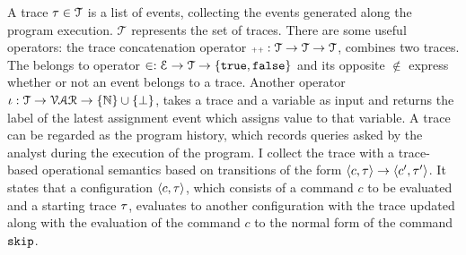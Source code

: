 A trace $\mathtt{\tau} \in \mathcal{T} $ is a list of events, 
collecting the events generated along the program execution. $\mathcal{T} $ represents the set of traces. There are some useful operators: the trace concatenation operator ${\scriptscriptstyle ++}: \mathcal{T} \to \mathcal{T} \to \mathcal{T}$, combines two traces.
The belongs to operator $\in : \mathcal{E} \to \mathcal{T} \to \{\mathtt{true}, \mathtt{false} \} $ and its opposite $\not\in$
express whether or not an event belongs to a trace.
Another operator $\iota : \mathcal{T} \to \mathcal{VAR} \to \{\mathbb{N}\}\cup \{\bot\}$,
takes a trace and a variable as input and returns the label of the latest assignment event which assigns value to that variable. 
%
A trace can be regarded as the program history, which records queries asked by the analyst during the execution of the program. I collect the trace with a trace-based operational semantics based on transitions of the form $ \langle c, \mathtt{\tau} \rangle \to \langle c', \mathtt{\tau}' \rangle $. It states that a configuration $\langle c, \mathtt{\tau} \rangle$, which consists of a command $c$ to be evaluated and a starting trace $\mathtt{\tau}$, evaluates to another configuration with the trace updated along with the evaluation of the command $c$ to the normal form of the command $\mathtt{skip}$.

